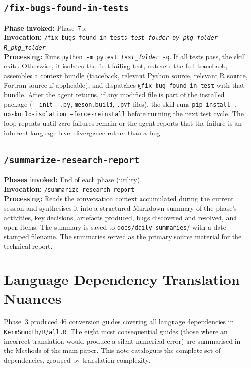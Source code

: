 \documentclass[12pt,a4paper]{article}
\makeatletter
\newcommand{\agent}[1]{\texttt{@#1}}
\makeatother
\begin{document}
\subsection{\texttt{/fix-bugs-found-in-tests}}
\label{supp:skill-fix-bugs}

\textbf{Phase invoked:} Phase~7b.\\
\textbf{Invocation:} \texttt{/fix-bugs-found-in-tests \textit{test\_folder} \textit{py\_pkg\_folder} \textit{R\_pkg\_folder}}\\
\textbf{Processing:} Runs \texttt{python~-m~pytest~\textit{test\_folder}~-q}. If all tests pass, the skill exits. Otherwise, it isolates the first failing test, extracts the full traceback, assembles a context bundle (traceback, relevant Python source, relevant R source, Fortran source if applicable), and dispatches \agent{fix-bug-found-in-test} with that bundle. After the agent returns, if any modified file is part of the installed package (\texttt{\_\_init\_\_.py}, \texttt{meson.build}, \texttt{.pyf} files), the skill runs \texttt{pip install . --no-build-isolation --force-reinstall} before running the next test cycle. The loop repeats until zero failures remain or the agent reports that the failure is an inherent language-level divergence rather than a bug.

\subsection{\texttt{/summarize-research-report}}
\label{supp:skill-summarize}

\textbf{Phases invoked:} End of each phase (utility).\\
\textbf{Invocation:} \texttt{/summarize-research-report}\\
\textbf{Processing:} Reads the conversation context accumulated during the current session and synthesises it into a structured Markdown summary of the phase's activities, key decisions, artefacts produced, bugs discovered and resolved, and open items. The summary is saved to \texttt{docs/daily\_summaries/} with a date-stamped filename. The summaries served as the primary source material for the technical report.

\section{Language Dependency Translation Nuances}
\label{supp:guides}

Phase~3 produced 46 conversion guides covering all language dependencies in \texttt{KernSmooth/R/all.R}. The eight most consequential guides (those where an incorrect translation would produce a silent numerical error) are summarised in the Methods of the main paper. This note catalogues the complete set of dependencies, grouped by translation complexity.
\end{document}
